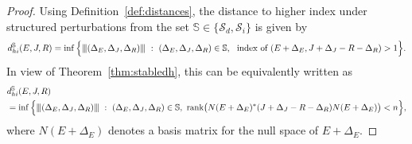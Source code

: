 \documentclass[10pt,a4paper]{amsart}
\newcommand{\nnrm}[1]{{\left\vert\kern-0.25ex\left\vert\kern-0.25ex\left\vert #1
		\right\vert\kern-0.25ex\right\vert\kern-0.25ex\right\vert}}
\begin{document}
\begin{proof}
    Using Definition~\eqref{def:distances}, the distance to higher index under structured perturbations from the set $\mathbb S\in \{\mathcal S_d,\mathcal S_i\}$ is given by
    \[
    d_{hi}^{\mathbb S}(E,J,R) = \inf\Big\{\nnrm{(\Delta_E,\Delta_J,\Delta_R)} ~:~ (\Delta_E,\Delta_J,\Delta_R)\in \mathbb S,~ \text{ index of } (E+\Delta_E,J+\Delta_J-R-\Delta_R) > 1 \Big\}.
    \]
    In view of Theorem~\ref{thm:stabledh}, this can be equivalently written as
    \begin{align*}
        &d_{hi}^{\mathbb S}(E,J,R) \\ &= \inf\Big\{ \nnrm{(\Delta_E,\Delta_J,\Delta_R)} ~:~ (\Delta_E,\Delta_J,\Delta_R)\in \mathbb S,~ \text{rank}\big(N(E+\Delta_E)^* (J+\Delta_J-R-\Delta_R) N(E+\Delta_E) \big) < n \Big\},
    \end{align*}
    where $N(E+\Delta_E)$ denotes a basis matrix for the null space of $E+\Delta_E$.


\end{proof}
\end{document}
